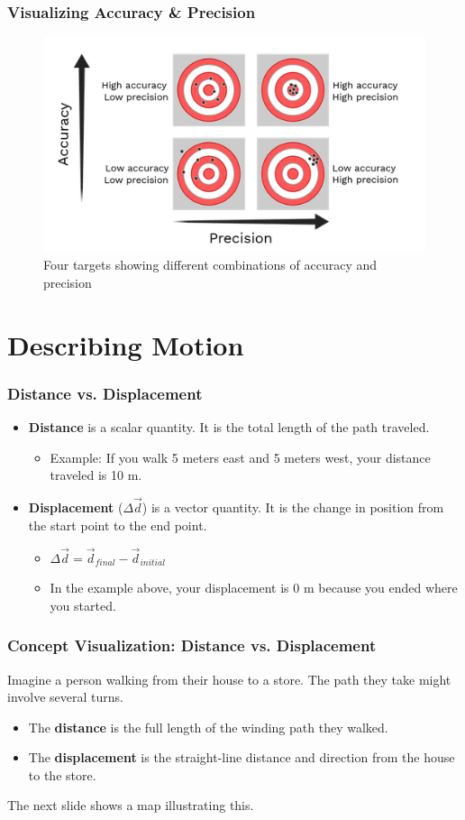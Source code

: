 \documentclass{beamer}
\begin{document}
\begin{frame}
\frametitle{Visualizing Accuracy \& Precision}
\begin{figure}
    \centering
    \includegraphics[width=0.8\linewidth]{phys11-accuracy-precision-targets.png}
    \caption{Four targets showing different combinations of accuracy and precision}
\end{figure}
\end{frame}

\section{Describing Motion}

\begin{frame}
\frametitle{Distance vs. Displacement}
\begin{itemize}
    \item \textbf{Distance} is a \alert{scalar} quantity. It is the total length of the path traveled.
    \begin{itemize}
        \item Example: If you walk 5 meters east and 5 meters west, your distance traveled is 10 m.
    \end{itemize}
    \item \textbf{Displacement} ($\Delta\vec{d}$) is a \alert{vector} quantity. It is the change in position from the start point to the end point.
    \begin{itemize}
        \item $\Delta\vec{d} = \vec{d}_{final} - \vec{d}_{initial}$
        \item In the example above, your displacement is 0 m because you ended where you started.
    \end{itemize}
\end{itemize}
\end{frame}

\begin{frame}
\frametitle{Concept Visualization: Distance vs. Displacement}
Imagine a person walking from their house to a store. The path they take might involve several turns.
\begin{itemize}
    \item The \textbf{distance} is the full length of the winding path they walked.
    \item The \textbf{displacement} is the straight-line distance and direction from the house to the store.
\end{itemize}
The next slide shows a map illustrating this.
\end{frame}
\end{document}
